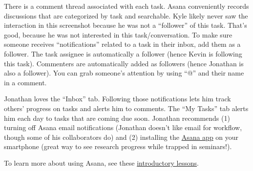There is a comment thread associated with each task.
Asana conveniently records discussions that are categorized by task and searchable.
Kyle likely never saw the interaction in this screenshot because he was not a ``follower'' of this task.
That's good, because he was not interested in this task/conversation.
To make sure someone receives ``notifications'' related to a task in their inbox, add them as a follower.
The task assignee is automatically a follower (hence Kevin is following this task).
Commenters are automatically added as followers (hence Jonathan is also a follower).
You can grab someone's attention by using ``@'' and their name in a comment.


Jonathan loves the ``Inbox'' tab.
Following those notifications lets him track others' progress on tasks and alerts him to comments.
The ``My Tasks'' tab alerts him each day to tasks that are coming due soon.
Jonathan recommends 
(1) turning off Asana email notifications (Jonathan doesn't like email for workflow, though some of his collaborators do)
and 
(2) installing the \href{https://asana.com/apps/asana}{Asana app} on your smartphone (great way to see research progress while trapped in seminars!).



To learn more about using Asana, see these \href{https://asana.com/guide/resources/get-started/quick-start#lessons?lesson=tasks-1}{introductory lessons}.